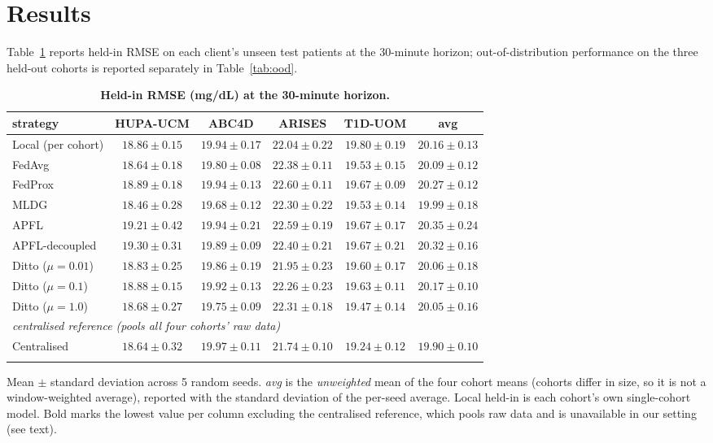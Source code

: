 \documentclass[10pt,letterpaper]{article}
\newlength\savedwidth
\newcommand\thickhline{\noalign{\global\savedwidth\arrayrulewidth\global\arrayrulewidth 2pt}%
\hline
\noalign{\global\arrayrulewidth\savedwidth}}
\begin{document}
\section*{Results}

Table~\ref{tab:main} reports held-in RMSE on each client's unseen test patients at
the 30-minute horizon; out-of-distribution performance on
the three held-out cohorts is reported separately in Table~\ref{tab:ood}.

\begin{table}[!ht]
\centering
\captionsetup{justification=centering,singlelinecheck=on}
\caption{\bf Held-in RMSE (mg/dL) at the 30-minute horizon.}
\label{tab:main}
\begin{tabular}{lccccc}
\thickhline
strategy & HUPA-UCM & ABC4D & ARISES & T1D-UOM & avg \\
\hline
Local (per cohort) & $18.86 \pm 0.15$ & $19.94 \pm 0.17$ & $22.04 \pm 0.22$ & $19.80 \pm 0.19$ & $20.16 \pm 0.13$ \\
\hline
FedAvg  & $18.64 \pm 0.18$ & $19.80 \pm 0.08$ & $22.38 \pm 0.11$ & $19.53 \pm 0.15$ & $20.09 \pm 0.12$ \\
FedProx & $18.89 \pm 0.18$ & $19.94 \pm 0.13$ & $22.60 \pm 0.11$ & $19.67 \pm 0.09$ & $20.27 \pm 0.12$ \\
MLDG    & $\mathbf{18.46 \pm 0.28}$ & $\mathbf{19.68 \pm 0.12}$ & $22.30 \pm 0.22$ & $19.53 \pm 0.14$ & $\mathbf{19.99 \pm 0.18}$ \\
\hline
APFL           & $19.21 \pm 0.42$ & $19.94 \pm 0.21$ & $22.59 \pm 0.19$ & $19.67 \pm 0.17$ & $20.35 \pm 0.24$ \\
APFL-decoupled & $19.30 \pm 0.31$ & $19.89 \pm 0.09$ & $22.40 \pm 0.21$ & $19.67 \pm 0.21$ & $20.32 \pm 0.16$ \\
Ditto ($\mu{=}0.01$) & $18.83 \pm 0.25$ & $19.86 \pm 0.19$ & $\mathbf{21.95 \pm 0.23}$ & $19.60 \pm 0.17$ & $20.06 \pm 0.18$ \\
Ditto ($\mu{=}0.1$)  & $18.88 \pm 0.15$ & $19.92 \pm 0.13$ & $22.26 \pm 0.23$ & $19.63 \pm 0.11$ & $20.17 \pm 0.10$ \\
Ditto ($\mu{=}1.0$)  & $18.68 \pm 0.27$ & $19.75 \pm 0.09$ & $22.31 \pm 0.18$ & $\mathbf{19.47 \pm 0.14}$ & $20.05 \pm 0.16$ \\
\hline
\multicolumn{6}{l}{\emph{centralised reference (pools all four cohorts' raw data)}} \\
Centralised & $18.64 \pm 0.32$ & $19.97 \pm 0.11$ & $21.74 \pm 0.10$ & $19.24 \pm 0.12$ & $19.90 \pm 0.10$ \\
\thickhline
\end{tabular}
\begin{center}
{\small Mean $\pm$ standard deviation across 5 random seeds.
\emph{avg} is the \emph{unweighted} mean of the four cohort means (cohorts differ
in size, so it is not a window-weighted average), reported with the standard
deviation of the per-seed average. Local held-in is each cohort's own
single-cohort model. Bold marks the lowest value per column excluding the
centralised reference, which pools raw data and is unavailable in our setting
(see text).}
\end{center}
\end{table}
\end{document}
